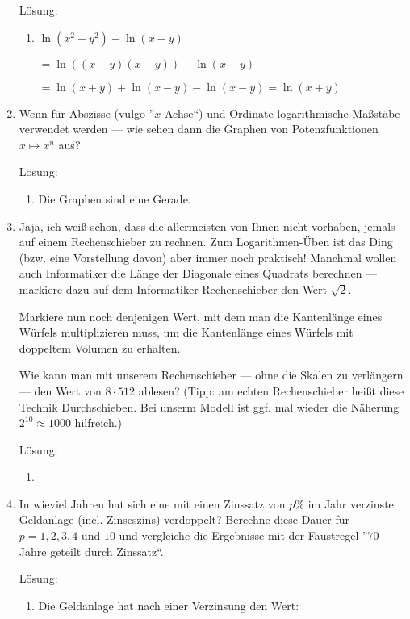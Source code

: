 \documentclass[../main.tex]{subfiles}
\begin{document}
\begin{enumerate}
	      Lösung:
	      \begin{enumerate}
		      \item \( \ln(x^2 - y^2) - \ln(x - y) \)

		            \( = \ln((x + y)(x - y)) - \ln(x - y) \)

		            \( = \ln(x + y) + \ln(x - y) - \ln(x - y)
		            = \ln (x + y) \)
	      \end{enumerate}
	\item Wenn für Abszisse (vulgo ”\( x \)-Achse“) und Ordinate logarithmische
	      Maßstäbe verwendet werden —
	      wie sehen dann die Graphen von Potenzfunktionen \( x \mapsto x^n \) aus?

	      Lösung:
	      \begin{enumerate}
		      \item Die Graphen sind eine Gerade.
	      \end{enumerate}
	\item Jaja, ich weiß schon, dass die allermeisten von Ihnen nicht vorhaben, jemals auf einem Rechenschieber zu rechnen.
	      Zum Logarithmen-Üben ist das Ding (bzw. eine Vorstellung davon) aber immer noch praktisch!
	      Manchmal wollen auch Informatiker die Länge der Diagonale eines Quadrats berechnen — markiere dazu auf dem
	      Informatiker-Rechenschieber den Wert \( \sqrt{2} \).

	      Markiere nun noch denjenigen Wert, mit dem man die Kantenlänge eines Würfels multiplizieren muss,
	      um die Kantenlänge eines Würfels mit doppeltem Volumen zu erhalten.

	      Wie kann man mit unserem Rechenschieber — ohne die Skalen zu verlängern —
	      den Wert von \( 8 \cdot 512 \) ablesen?
	      (Tipp: am echten Rechenschieber heißt diese Technik Durchschieben. Bei unserm Modell ist ggf.
	      mal wieder die Näherung \( 2^{10} \approx 1000 \) hilfreich.)

	      Lösung:
	      \begin{enumerate}
		      \item
	      \end{enumerate}
	\item In wieviel Jahren hat sich eine mit einen Zinssatz von \( p\% \)
	      im Jahr verzinste Geldanlage (incl. Zinseszins) verdoppelt?
	      Berechne diese Dauer für \( p = 1,2,3,4 \) und \( 10 \) und
	      vergleiche die Ergebnisse mit der Faustregel ”\( 70 \) Jahre geteilt durch
	      Zinssatz“.

	      Lösung:
	      \begin{enumerate}
		      \item Die Geldanlage hat nach einer Verzinsung den Wert:


\end{enumerate}
\end{enumerate}
\end{document}
